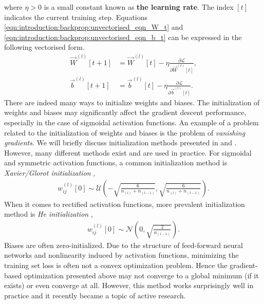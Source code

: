 where $\eta > 0$ is a small constant known as \textbf{the learning rate}. The index $[t]$ indicates the current training step.
Equations \ref{eqn:introduction:backprop:unvectorised_eqn_W_t} and \ref{eqn:introduction:backprop:unvectorised_eqn_b_t} can be expressed in the following vectorised form.
\begin{subequations}
\begin{align}
    \vec{W}^{(l)}[t + 1] &= \vec{W}^{(l)}[t] - \eta \frac{\partial \mathcal{L}}{\partial \vec{W}^{(l)}[t]}, \label{eqn:introduction:backprop:vectorised_eqn_W_t} \\ 
    \vec{b}^{(l)}[t + 1] &= \vec{b}^{(l)}[t] - \eta \frac{\partial \mathcal{L}}{\partial \vec{b}^{(l)}[t]}. \label{eqn:introduction:backprop:vectorised_eqn_b_t}
\end{align}
\end{subequations}
There are indeed many ways to initialize weights and biases. The initialization of weights and biases may significantly affect the gradient descent performance, especially in the case of sigmoidal activation functions. An example of a problem related to the initialization of weights and biases is the problem of \textit{vanishing gradients}. We will briefly discuss initialization methods presented in \cite{glorot_understanding} and \cite{he_2015_delving}. However, many different methods exist and are used in practice. For sigmoidal and symmetric activation functions, a common initialization method is \textit{ Xavier/Glorot initialization} \cite{glorot_understanding},
\begin{align*}
     w_{ij}^{(l)} [0] \sim \mathcal{U} \left (-\sqrt{\frac{6}{n_{(l)} + n_{(l - 1)}}}, \sqrt{\frac{6}{n_{(l)} + n_{(l - 1)}}}  \right ).
\end{align*}
When it comes to rectified activation functions, more prevalent initialization method is \textit{He initialization} \cite{he_2015_delving},
\begin{align*}
     w_{ij}^{(l)} [0] \sim \mathcal{N} \left (0, \sqrt{\frac{2}{n_{(l-1)}}} \right).
\end{align*}
Biases are often zero-initialized. Due to the structure of feed-forward neural networks and nonlinearity induced by activation functions, minimizing the training set loss is often not a convex optimization problem. Hence the gradient-based optimization presented above may not converge to a global minimum (if it exists) or even converge at all. However, this method works surprisingly well in practice and it recently became a topic of active research. 
